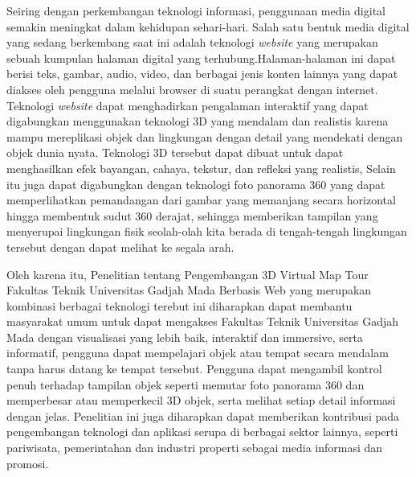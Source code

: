 Seiring dengan perkembangan teknologi informasi, penggunaan media digital semakin meningkat
dalam kehidupan sehari-hari. Salah satu bentuk media digital yang sedang berkembang saat ini
adalah teknologi \emph{website} yang merupakan sebuah kumpulan halaman digital yang terhubung.Halaman-halaman
ini dapat berisi teks, gambar, audio, video, dan berbagai jenis konten lainnya yang dapat diakses 
oleh pengguna melalui browser di suatu perangkat dengan internet\cite{whatiswebsite}. Teknologi \emph{website} dapat menghadirkan 
pengalaman interaktif yang dapat digabungkan menggunakan teknologi 3D yang mendalam dan 
realistis karena mampu mereplikasi
objek dan lingkungan dengan detail yang mendekati dengan objek dunia nyata\cite{whatis3dobject}. 
Teknologi 3D tersebut dapat dibuat untuk dapat menghasilkan efek bayangan, cahaya, tekstur, dan refleksi yang realistis,
Selain itu juga dapat digabungkan dengan teknologi foto panorama 360 yang dapat 
memperlihatkan pemandangan dari gambar yang memanjang secara horizontal hingga membentuk
sudut 360 derajat, sehingga memberikan tampilan yang menyerupai lingkungan fisik seolah-olah 
kita berada di tengah-tengah lingkungan tersebut dengan dapat melihat ke segala arah\cite{whatis360panorama}.


Oleh karena itu, Penelitian tentang Pengembangan 3D Virtual Map Tour Fakultas Teknik Universitas 
Gadjah Mada Berbasis Web yang merupakan kombinasi berbagai teknologi terebut ini diharapkan dapat
membantu masyarakat umum untuk dapat mengakses Fakultas Teknik Universitas Gadjah Mada dengan visualisasi yang lebih baik, interaktif dan immersive, 
serta informatif, pengguna dapat mempelajari objek 
atau tempat secara mendalam tanpa harus datang ke tempat tersebut. Pengguna dapat mengambil 
kontrol penuh terhadap tampilan objek seperti memutar foto panorama 360 dan memperbesar atau 
memperkecil 3D objek, serta melihat setiap detail informasi dengan jelas.
Penelitian ini juga diharapkan dapat memberikan kontribusi pada pengembangan teknologi dan aplikasi
serupa di berbagai sektor lainnya, seperti pariwisata, pemerintahan dan industri properti sebagai
media informasi dan promosi.


